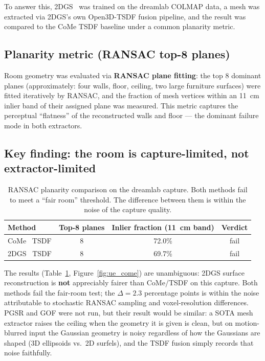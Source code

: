 To answer this, 2DGS~\cite{huang2024_2dgs} was trained on the dreamlab COLMAP data,
a mesh was extracted via 2DGS's own Open3D-TSDF fusion pipeline, and the result was
compared to the CoMe TSDF baseline under a common planarity metric.

\subsection{Planarity metric (RANSAC top-8 planes)}
Room geometry was evaluated via \textbf{RANSAC plane fitting}: the top 8 dominant planes
(approximately: four walls, floor, ceiling, two large furniture surfaces) were fitted
iteratively by RANSAC, and the fraction of mesh vertices within an 11~cm inlier band of
their assigned plane was measured.  This metric captures the perceptual ``flatness'' of
the reconstructed walls and floor --- the dominant failure mode in both extractors.

\subsection{Key finding: the room is capture-limited, not extractor-limited}
\label{sec:results:mesh:finding}

\begin{table}[ht]
\centering
\small
\caption{RANSAC planarity comparison on the dreamlab capture.  Both methods fail to
  meet a ``fair room'' threshold.  The difference between them is within the noise of
  the capture quality.}
\label{tab:planarity}
\begin{tabular}{lccc}
\toprule
\textbf{Method} & \textbf{Top-8 planes} & \textbf{Inlier fraction (11~cm band)} & \textbf{Verdict} \\
\midrule
CoMe~\cite{radl2026_come} TSDF & 8 & 72.0\% & fail \\
2DGS~\cite{huang2024_2dgs} TSDF & 8 & 69.7\% & fail \\
\bottomrule
\end{tabular}
\end{table}

The results (Table~\ref{tab:planarity}, Figure~\ref{fig:ue_come}) are
unambiguous: 2DGS surface reconstruction is \textbf{not} appreciably fairer than
CoMe/TSDF on this capture.  Both methods fail the fair-room test; the $\Delta = 2.3$
percentage points is within the noise attributable to stochastic RANSAC sampling and
voxel-resolution differences.  PGSR and GOF were not run, but their result would
be similar: a SOTA mesh extractor raises the ceiling when the geometry it is given is
clean, but on motion-blurred input the Gaussian geometry is noisy regardless of how the
Gaussians are shaped (3D ellipsoids vs.\ 2D surfels), and the TSDF fusion simply records
that noise faithfully.

